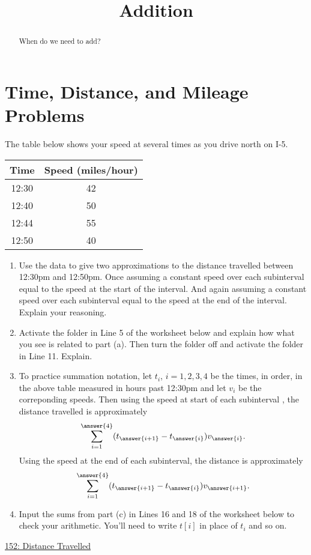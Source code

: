 \documentclass{ximera}
\title{Addition}
\begin{document}
\begin{abstract}
When do we need to add?
\end{abstract}
\maketitle


\section{Time, Distance, and Mileage Problems}

\begin{exercise}  \label{EXKDmFMERE}
The table below shows your speed at several times as you drive north on I-5. 

\begin{tabular}{|c|c|}
\hline
Time & Speed (miles/hour) \\
\hline
12:30 & 42 \\  \hline
12:40 & 50 \\ \hline
12:44 & 55 \\ \hline
12:50 & 40 \\
\hline
\end{tabular}


\begin{enumerate}
\item Use the data to give two approximations to the distance travelled between 12:30pm and 12:50pm. Once assuming a constant speed over each subinterval equal to the speed at the start of the interval. And again assuming a constant speed over each subinterval equal to the speed at the end of the interval. Explain your reasoning.

\item Activate the folder in Line 5 of the worksheet below and explain how what you see is related to part (a). Then turn the folder off and activate the folder in Line 11. Explain. 

\item To practice summation notation, let $t_i$, $i=1,2,3,4$ be the times, in order, in the above table measured in hours past 12:30pm and let $v_i$ be the correponding speeds. Then using the speed at start of each subinterval , the distance travelled is approximately 
\[
   \sum_{i=1}^{\answer{4}}(t_{\answer{i+1}} - t_{\answer{i}})v_{\answer{i}}. 
\]
Using the speed at the end of each subinterval, the distance is approximately
\[
    \sum_{i=1}^{\answer{4}}(t_{\answer{i+1}} - t_{\answer{i}})v_{\answer{i+1}}.
\]

\item Input the sums from part (c) in Lines 16 and 18 of the worksheet below to check your arithmetic. You'll need to write $t[i]$ in place of $t_i$ and so on.
\end{enumerate}

\begin{onlineOnly}
    \begin{center}
\end{center}
\end{onlineOnly}

\href{https://www.desmos.com/calculator/jjobuctzsa}{152: Distance Travelled}
\end{exercise}
\end{document}
